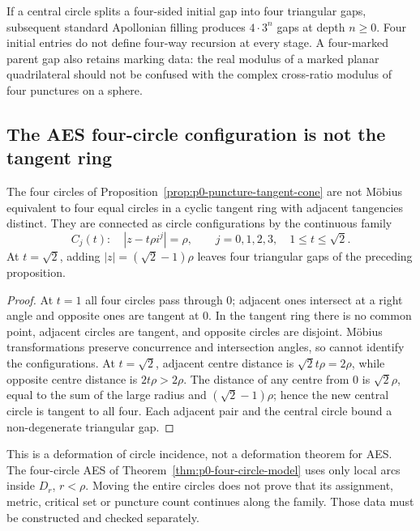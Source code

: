 If a central circle splits a four-sided initial gap into four triangular gaps,
subsequent standard Apollonian filling produces $4\cdot3^n$ gaps at depth
$n\ge0$.  Four initial entries do not define four-way recursion at every
stage.  A four-marked parent gap also retains marking data: the real modulus
of a marked planar quadrilateral should not be confused with the complex
cross-ratio modulus of four punctures on a sphere.

\subsection{The AES four-circle configuration is not the tangent ring}

\begin{proposition}
\label{prop:p0-four-circle-deformation}
The four circles of Proposition~\ref{prop:p0-puncture-tangent-cone} are not
M\"obius equivalent to four equal circles in a cyclic tangent ring with
adjacent tangencies distinct.  They are connected as circle configurations
by the continuous family
\[
 C_j(t):\quad |z-t\rho i^j|=\rho,
 \qquad j=0,1,2,3,\quad 1\le t\le\sqrt2.
\]
At $t=\sqrt2$, adding $|z|=(\sqrt2-1)\rho$ leaves four triangular gaps of
the preceding proposition.
\end{proposition}

\begin{proof}
At $t=1$ all four circles pass through $0$; adjacent ones intersect at a right
angle and opposite ones are tangent at $0$.  In the tangent ring there is no
common point, adjacent circles are tangent, and opposite circles are disjoint.
M\"obius transformations preserve concurrence and intersection angles, so
cannot identify the configurations.  At $t=\sqrt2$, adjacent centre distance
is $\sqrt2t\rho=2\rho$, while opposite centre distance is $2t\rho>2\rho$.
The distance of any centre from $0$ is $\sqrt2\rho$, equal to the sum of the
large radius and $(\sqrt2-1)\rho$; hence the new central circle is tangent
to all four.  Each adjacent pair and the central circle bound a
non-degenerate triangular gap.
\end{proof}

This is a deformation of circle incidence, not a deformation theorem for AES.
The four-circle AES of Theorem~\ref{thm:p0-four-circle-model} uses only local
arcs inside $D_r$, $r<\rho$.  Moving the entire circles does not prove that
its assignment, metric, critical set or puncture count continues along the
family.  Those data must be constructed and checked separately.

